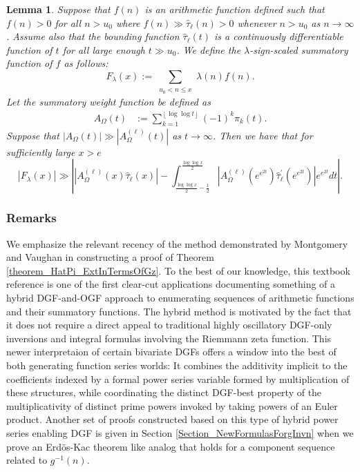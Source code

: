 \documentclass[11pt,reqno,a4letter]{article}
\numberwithin{figure}{section}
\numberwithin{table}{section}
\newcommand{\floor}[1]{\left\lfloor #1 \right\rfloor}
\theoremstyle{plain}
\newtheorem{lemma}[theorem]{Lemma}
\numberwithin{theorem}{section}
\theoremstyle{definition}
\newcommand{\SuccSim}[0]{\overset{_{\scriptsize{\blacktriangle}}}{\succsim}}
\renewcommand{\SuccSim}[0]{\ensuremath{\gg}}
\begin{document}
\begin{lemma} 
\label{lemma_CLT_and_AbelSummation} 
Suppose that $f(n)$ is an arithmetic function defined 
such that $f(n) > 0$ for all $n > u_0$ where 
$f(n) \SuccSim \widehat{\tau}_{\ell}(n) > 0$ whenever $n > u_0$ 
as $n \rightarrow \infty$. Assume also that 
the bounding function $\widehat{\tau}_{\ell}(t)$ is a 
continuously differentiable function of $t$ for all 
large enough $t \gg u_0$.  
We define the $\lambda$-sign-scaled summatory function of $f$ as follows: 
\[
F_{\lambda}(x) := \sum_{\substack{u_0 < n \leq x}} \lambda(n) f(n). 
\]
Let the summatory weight function be defined as 
\begin{align*} 
A_{\Omega}(t) & := \sum_{k=1}^{\floor{\log\log t}} (-1)^k \widehat{\pi}_k(t). 
\end{align*} 
Suppose that $|A_{\Omega}(t)| \gg |A_{\Omega}^{(\ell)}(t)|$ as $t \rightarrow \infty$. 
Then we have that for sufficiently large $x > e$ 
\begin{equation} 
\label{eqn_Flambdax_RHA_AbelSummationFormula_v1} 
|F_{\lambda}(x)| \SuccSim \left\lvert 
     \left\lvert A_{\Omega}^{(\ell)}(x) \widehat{\tau}_{\ell}(x) \right\rvert - 
     \int_{\frac{\log\log x}{2} - \frac{1}{2}}^{\frac{\log\log x}{2}} 
     \left\lvert A_{\Omega}^{(\ell)}\left(e^{e^{2t}}\right) 
     \widehat{\tau}_{\ell}^{\prime}\left(e^{e^{2t}}\right) 
     \right\rvert e^{e^{2t}} dt 
     \right\rvert.  
\end{equation} 
\end{lemma} 

\subsubsection{Remarks} 

We emphasize the relevant recency of the method demonstrated by 
Montgomery and Vaughan in constructing a proof of 
Theorem \ref{theorem_HatPi_ExtInTermsOfGz}. 
To the best of our knowledge, this textbook reference is 
one of the first clear-cut applications documenting something of a hybrid 
DGF-and-OGF approach to enumerating sequences of arithmetic functions 
and their summatory functions. The hybrid method is motivated by the fact that it 
does not require a direct appeal to 
traditional highly oscillatory DGF-only inversions and integral formulas 
involving the Riemmann zeta function. 
This newer interpretaion of certain bivariate DGFs 
offers a window into the best of both generating function series worlds: 
It combines the additivity 
implicit to the coefficients indexed by a formal power series variable formed by 
multiplication of these structures, while coordinating the distinct DGF-best 
property of the multiplicativity of distinct prime powers invoked 
by taking powers of an Euler product. 
Another set of proofs constructed based on this type of hybrid power series enabling 
DGF is given in Section \ref{Section_NewFormulasForgInvn} 
when we prove an Erd\"os-Kac theorem like analog 
that holds for a component sequence related to $g^{-1}(n)$. 
\end{document}
